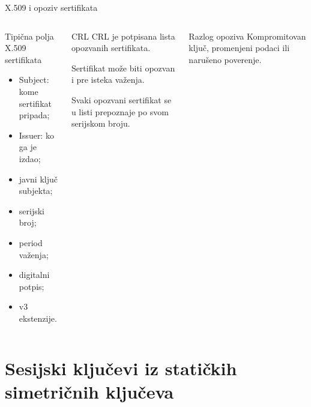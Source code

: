 \documentclass[aspectratio=1610]{beamer}
\begin{document}
\begin{frame}[t]{X.509 i opoziv sertifikata}
\small
\begin{columns}[T,onlytextwidth]
\begin{block}{Tipična polja X.509 sertifikata}
\begin{itemize}
    \item Subject: kome sertifikat pripada;
    \item Issuer: ko ga je izdao;
    \item javni ključ subjekta;
    \item serijski broj;
    \item period važenja;
    \item digitalni potpis;
    \item v3 ekstenzije.
\end{itemize}
\end{block}

\begin{block}{CRL}
CRL je potpisana lista opozvanih sertifikata.

\medskip
Sertifikat može biti opozvan i pre isteka važenja.

\medskip
Svaki opozvani sertifikat se u listi prepoznaje po svom serijskom broju.
\end{block}

\begin{alertblock}{Razlog opoziva}
Kompromitovan ključ, promenjeni podaci ili narušeno poverenje.
\end{alertblock}
\end{columns}
\end{frame}

\section{Sesijski ključevi iz statičkih simetričnih ključeva}
\end{document}
